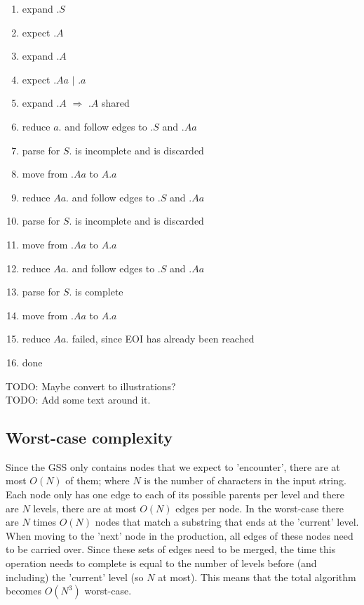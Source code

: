 \documentclass[a4paper,10pt]{article}
\begin{document}
\begin{enumerate}
 \setlength{\itemsep}{0pt}
 \setlength{\parskip}{0pt}
 \setlength{\parsep}{0pt}
 
 \item expand $.S$
 \item expect $.A$
 \item expand $.A$
 \item expect $.Aa$ $|$ $.a$
 \item expand $.A$ $\Rightarrow$ $.A$ shared
 \item reduce $a.$ and follow edges to $.S$ and $.Aa$
 \item parse for $S.$ is incomplete and is discarded
 \item move from $.Aa$ to $A.a$
 \item reduce $Aa.$ and follow edges to $.S$ and $.Aa$
 \item parse for $S.$ is incomplete and is discarded
 \item move from $.Aa$ to $A.a$
 \item reduce $Aa.$ and follow edges to $.S$ and $.Aa$
 \item parse for $S.$ is complete
 \item move from $.Aa$ to $A.a$
 \item reduce $Aa.$ failed, since EOI has already been reached
 \item done
\end{enumerate}

TODO: Maybe convert to illustrations?\\
TODO: Add some text around it.

\subsection{Worst-case complexity}

Since the GSS only contains nodes that we expect to 'encounter', there are at most $O(N)$ of them; where $N$ is the number of characters in the input string. Each node only has one edge to each of its possible parents per level and there are $N$ levels, there are at most $O(N)$ edges per node. In the worst-case there are $N$ times $O(N)$ nodes that match a substring that ends at the 'current' level. When moving to the 'next' node in the production, all edges of these nodes need to be carried over. Since these sets of edges need to be merged, the time this operation needs to complete is equal to the number of levels before (and including) the 'current' level (so $N$ at most). This means that the total algorithm becomes $O(N^3)$ worst-case.
\end{document}
